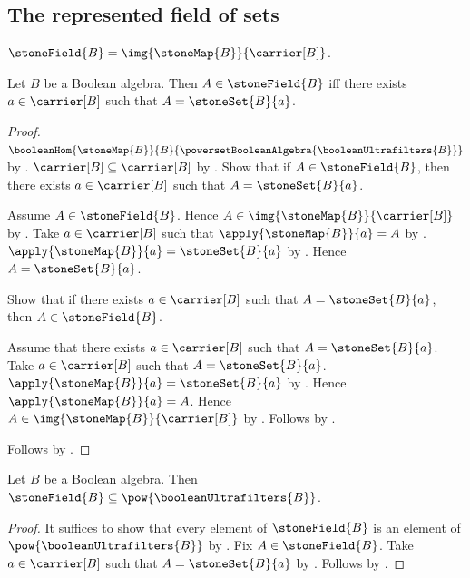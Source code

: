 \subsection{The represented field of sets}

\begin{definition}\label{stone_field}
    $\stoneField{B}=\img{\stoneMap{B}}{\carrier[B]}$.
\end{definition}

\begin{proposition}\label{stone_field_iff}
    Let $B$ be a Boolean algebra.
    Then $A\in\stoneField{B}$ iff
        there exists $a\in\carrier[B]$ such that
            $A=\stoneSet{B}{a}$.
\end{proposition}
\begin{proof}
    $\booleanHom
        {\stoneMap{B}}
        {B}
        {\powersetBooleanAlgebra{\booleanUltrafilters{B}}}$ by
        .
    $\carrier[B]\subseteq\carrier[B]$ by .
    Show that if $A\in\stoneField{B}$, then
        there exists $a\in\carrier[B]$ such that
            $A=\stoneSet{B}{a}$.
    \begin{subproof}
        Assume $A\in\stoneField{B}$.
        Hence $A\in\img{\stoneMap{B}}{\carrier[B]}$ by
            .
        Take $a\in\carrier[B]$ such that
            $\apply{\stoneMap{B}}{a}=A$ by
            .
        $\apply{\stoneMap{B}}{a}=\stoneSet{B}{a}$ by
            .
        Hence $A=\stoneSet{B}{a}$.
    \end{subproof}
    Show that if there exists $a\in\carrier[B]$ such that
        $A=\stoneSet{B}{a}$, then $A\in\stoneField{B}$.
    \begin{subproof}
        Assume that there exists $a\in\carrier[B]$ such that
            $A=\stoneSet{B}{a}$.
        Take $a\in\carrier[B]$ such that
            $A=\stoneSet{B}{a}$.
        $\apply{\stoneMap{B}}{a}=\stoneSet{B}{a}$ by
            .
        Hence $\apply{\stoneMap{B}}{a}=A$.
        Hence $A\in\img{\stoneMap{B}}{\carrier[B]}$ by
            .
        Follows by .
    \end{subproof}
    Follows by \auto.
\end{proof}

\begin{proposition}\label{stone_field_subseteq_powerset}
    Let $B$ be a Boolean algebra.
    Then $\stoneField{B}\subseteq
        \pow{\booleanUltrafilters{B}}$.
\end{proposition}
\begin{proof}
    It suffices to show that every element of $\stoneField{B}$
        is an element of $\pow{\booleanUltrafilters{B}}$ by
        .
    Fix $A\in\stoneField{B}$.
    Take $a\in\carrier[B]$ such that
        $A=\stoneSet{B}{a}$ by .
    Follows by .
\end{proof}

